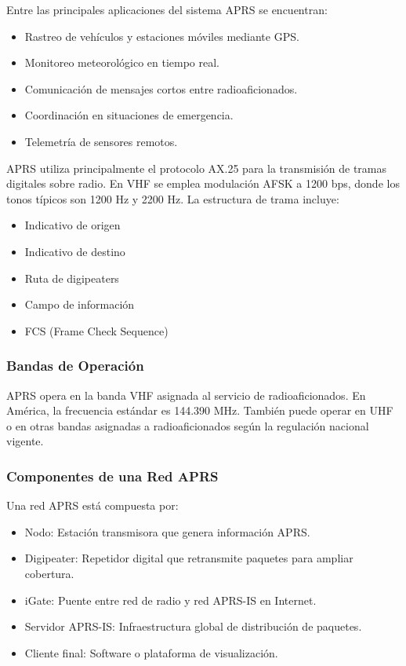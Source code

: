 \documentclass[conference]{IEEEtran}
\begin{document}
Entre las principales aplicaciones del sistema APRS se encuentran:
\begin{itemize}
    \item Rastreo de vehículos y estaciones móviles mediante GPS.
    \item Monitoreo meteorológico en tiempo real.
    \item Comunicación de mensajes cortos entre radioaficionados.
    \item Coordinación en situaciones de emergencia.
    \item Telemetría de sensores remotos.
\end{itemize}

APRS utiliza principalmente el protocolo AX.25 para la transmisión de tramas digitales sobre radio. En VHF se emplea modulación AFSK a 1200 bps, donde los tonos típicos son 1200 Hz y 2200 Hz. La estructura de trama incluye:
\begin{itemize}
    \item Indicativo de origen
    \item Indicativo de destino
    \item Ruta de digipeaters
    \item Campo de información
    \item FCS (Frame Check Sequence)
\end{itemize}

\subsubsection{Bandas de Operación}
APRS opera en la banda VHF asignada al servicio de radioaficionados. En América, la frecuencia estándar es 144.390 MHz. También puede operar en UHF o en otras bandas asignadas a radioaficionados según la regulación nacional vigente.

\subsubsection{Componentes de una Red APRS}
Una red APRS está compuesta por:
\begin{itemize}
    \item Nodo: Estación transmisora que genera información APRS.
    \item Digipeater: Repetidor digital que retransmite paquetes para ampliar cobertura.
    \item iGate: Puente entre red de radio y red APRS-IS en Internet.
    \item Servidor APRS-IS: Infraestructura global de distribución de paquetes.
    \item Cliente final: Software o plataforma de visualización.
\end{itemize}
\end{document}
